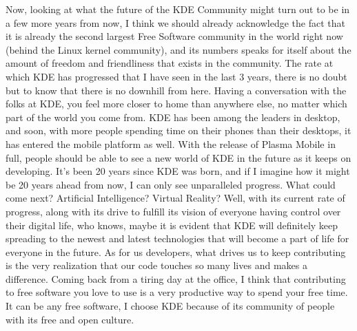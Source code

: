 Now, looking at what the future of the KDE Community might turn out to be in a few more years from now, I think we should already acknowledge the fact that it is already the second largest Free Software community in the world right now (behind the Linux kernel community), and its numbers speaks for itself about the amount of freedom and friendliness that exists in the community. The rate at which KDE has progressed that I have seen in the last 3 years, there is no doubt but to know that there is no downhill from here. Having a conversation with the folks at KDE, you feel more closer to home than anywhere else, no matter which part of the world you come from. KDE has been among the leaders in desktop, and soon, with more people spending time on their phones than their desktops, it has entered the mobile platform as well. With the release of Plasma Mobile in full, people should be able to see a new world of KDE in the future as it keeps on developing. It's been 20 years since KDE was born, and if I imagine how it might be 20 years ahead from now, I can only see unparalleled progress. What could come next? Artificial Intelligence? Virtual Reality? Well, with its current rate of progress, along with its drive to fulfill its vision of everyone having control over their digital life, who knows, maybe it is evident that KDE will definitely keep spreading to the newest and latest technologies that will become a part of life for everyone in the future. As for us developers, what drives us to keep contributing is the very realization that our code touches so many lives and makes a difference. Coming back from a tiring day at the office, I think that contributing to free software you love to use is a very productive way to spend your free time. It can be any free software, I choose KDE because of its community of people with its free and open culture.
